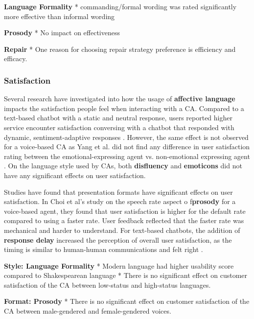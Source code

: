 \documentclass[sigconf,screen,review, anonymous]{acmart}
\newcommand{\cmt}[1]{}%
\begin{document}
\textbf{Language Formality}
* commanding/formal wording was rated significantly more effective than informal wording \cite{jestin2022effects}\cmt{[81]}

\textbf{Prosody}
* No impact on effectiveness \cite{jestin2022effects}\cmt{[81]}

\textbf{Repair}
* One reason for choosing repair strategy preference is efficiency and efficacy. \cite{ashktorab2019resilient}\cmt{[88]}

\subsubsection{Satisfaction}
Several research have investigated into how the usage of \textbf{affective language} impacts the satisfaction people feel when interacting with a CA. Compared to a text-based chatbot with a static and neutral response, users reported higher service encounter satisfaction conversing with a chatbot that responded with dynamic, sentiment-adaptive responses \cite{diederich2019emulating}\cmt{[25]}. However, the same effect is not observed for a voice-based CA as Yang et al. did not find any difference in user satisfaction rating between the emotional-expressing agent vs. non-emotional expressing agent \cite{yang2017perceived}\cmt{[44]}. On the language style used by CAs, both \textbf{disfluency} \cite{pfeifer2009should}\cmt{[12]} and \textbf{emoticons} \cite{wilhelm2022keep}\cmt{[28]} did not have any significant effects on user satisfaction.

Studies have found that presentation formats have significant effects on user satisfaction. In Choi et al's study \cite{choi2020nobody}\cmt{[54]} on the speech rate aspect o f\textbf{prosody} for a voice-based agent, they found that user satisfaction is higher for the default rate compared to using a faster rate. User feedback reflected that the faster rate was mechanical and harder to understand. For text-based chatbots, the addition of \textbf{response delay} increased the perception of overall user satisfaction, as the timing is similar to human-human communications and felt right \cite{gnewuch2018faster}\cmt{[19]}. 

\textbf{Style: Language Formality}
* Modern language had higher usability score compared to Shakespearean language \cite{elsholz2019exploring}\cmt{[61]}
* There is no significant effect on customer satisfaction of the CA between low-status and high-status languages. \cite{habler2019effects}\cmt{[63]}

\textbf{Format: Prosody}
* There is no significant effect on customer satisfaction of the CA between male-gendered and female-gendered voices. \cite{habler2019effects}\cmt{[63]}
\end{document}

